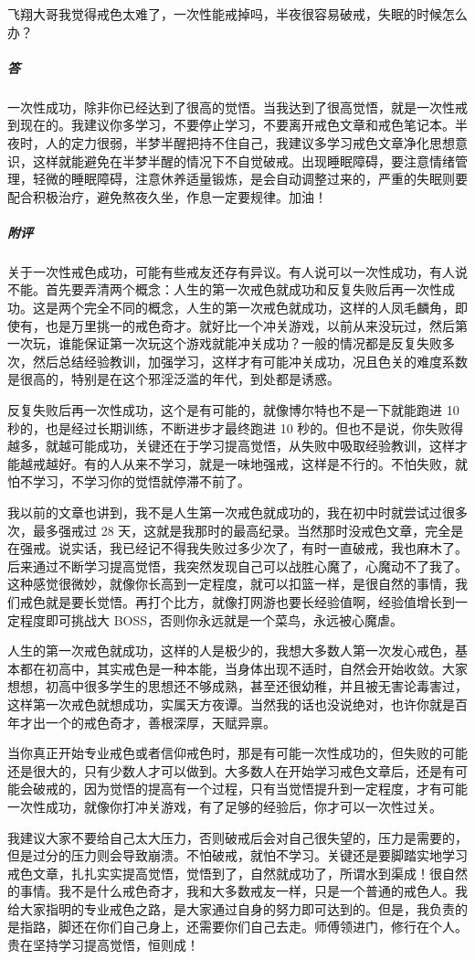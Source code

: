 \begin{case}
    飞翔大哥我觉得戒色太难了，一次性能戒掉吗，半夜很容易破戒，失眠的时候怎么办？
    \subparagraph{答} 一次性成功，除非你已经达到了很高的觉悟。当我达到了很高觉悟，就是一次性戒到现在的。我建议你多学习，不要停止学习，不要离开戒色文章和戒色笔记本。半夜时，人的定力很弱，半梦半醒把持不住自己，我建议多学习戒色文章净化思想意识，这样就能避免在半梦半醒的情况下不自觉破戒。出现睡眠障碍，要注意情绪管理，轻微的睡眠障碍，注意休养适量锻炼，是会自动调整过来的，严重的失眠则要配合积极治疗，避免熬夜久坐，作息一定要规律。加油！
    \subparagraph{附评} 关于一次性戒色成功，可能有些戒友还存有异议。有人说可以一次性成功，有人说不能。首先要弄清两个概念：人生的第一次戒色就成功和反复失败后再一次性成功。这是两个完全不同的概念，人生的第一次戒色就成功，这样的人凤毛麟角，即使有，也是万里挑一的戒色奇才。就好比一个冲关游戏，以前从来没玩过，然后第一次玩，谁能保证第一次玩这个游戏就能冲关成功？一般的情况都是反复失败多次，然后总结经验教训，加强学习，这样才有可能冲关成功，况且色关的难度系数是很高的，特别是在这个邪淫泛滥的年代，到处都是诱惑。

    反复失败后再一次性成功，这个是有可能的，就像博尔特也不是一下就能跑进 10 秒的，也是经过长期训练，不断进步才最终跑进 10 秒的。但也不是说，你失败得越多，就越可能成功，关键还在于学习提高觉悟，从失败中吸取经验教训，这样才能越戒越好。有的人从来不学习，就是一味地强戒，这样是不行的。不怕失败，就怕不学习，不学习你的觉悟就停滞不前了。

    我以前的文章也讲到，我不是人生第一次戒色就成功的，我在初中时就尝试过很多次，最多强戒过 28 天，这就是我那时的最高纪录。当然那时没戒色文章，完全是在强戒。说实话，我已经记不得我失败过多少次了，有时一直破戒，我也麻木了。后来通过不断学习提高觉悟，我突然发现自己可以战胜心魔了，心魔动不了我了。这种感觉很微妙，就像你长高到一定程度，就可以扣篮一样，是很自然的事情，我们戒色就是要长觉悟。再打个比方，就像打网游也要长经验值啊，经验值增长到一定程度即可挑战大 BOSS，否则你永远就是一个菜鸟，永远被心魔虐。

    人生的第一次戒色就成功，这样的人是极少的，我想大多数人第一次发心戒色，基本都在初高中，其实戒色是一种本能，当身体出现不适时，自然会开始收敛。大家想想，初高中很多学生的思想还不够成熟，甚至还很幼稚，并且被无害论毒害过，这样第一次戒色就想成功，实属天方夜谭。当然我的话也没说绝对，也许你就是百年才出一个的戒色奇才，善根深厚，天赋异禀。

    当你真正开始专业戒色或者信仰戒色时，那是有可能一次性成功的，但失败的可能还是很大的，只有少数人才可以做到。大多数人在开始学习戒色文章后，还是有可能会破戒的，因为觉悟的提高有一个过程，只有当觉悟提升到一定程度，才有可能一次性成功，就像你打冲关游戏，有了足够的经验后，你才可以一次性过关。

    我建议大家不要给自己太大压力，否则破戒后会对自己很失望的，压力是需要的，但是过分的压力则会导致崩溃。不怕破戒，就怕不学习。关键还是要脚踏实地学习戒色文章，扎扎实实提高觉悟，觉悟到了，自然就成功了，所谓水到渠成！很自然的事情。我不是什么戒色奇才，我和大多数戒友一样，只是一个普通的戒色人。我给大家指明的专业戒色之路，是大家通过自身的努力即可达到的。但是，我负责的是指路，脚还在你们自己身上，还需要你们自己去走。师傅领进门，修行在个人。贵在坚持学习提高觉悟，恒则成！
\end{case}

